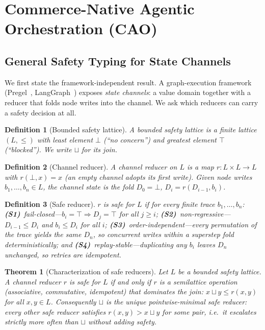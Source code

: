 \documentclass{article}
\newtheorem{definition}{Definition}
\newtheorem{theorem}{Theorem}
\begin{document}
\section{Commerce-Native Agentic Orchestration (CAO)}
\label{sec:cao}

\subsection{General Safety Typing for State Channels}
\label{sec:general_typing}

We first state the framework-independent result. A graph-execution framework
(Pregel~\cite{pregel}, LangGraph~\cite{langgraph}) exposes \emph{state channels}:
a value domain together with a reducer that folds node writes into the channel.
We ask which reducers can carry a safety decision at all.

\begin{definition}[Bounded safety lattice]
A \emph{bounded safety lattice} is a finite lattice $(L,\leq)$ with least element
$\bot$ (``no concern'') and greatest element $\top$ (``blocked''). We write
$\sqcup$ for its join.
\end{definition}

\begin{definition}[Channel reducer]
A \emph{channel reducer} on $L$ is a map $r: L\times L\to L$ with $r(\bot,x)=x$
(an empty channel adopts its first write). Given node writes $b_1,\dots,b_n\in L$,
the channel state is the fold $D_0=\bot$, $D_i=r(D_{i-1},b_i)$.
\end{definition}

\begin{definition}[Safe reducer]
\label{def:safe}
$r$ is \emph{safe} for $L$ if for every finite trace $b_1,\dots,b_n$:
\textbf{(S1)}~\emph{fail-closed}---$b_i=\top\Rightarrow D_j=\top$ for all $j\ge i$;
\textbf{(S2)}~\emph{non-regressive}---$D_{i-1}\le D_i$ and $b_i\le D_i$ for all $i$;
\textbf{(S3)}~\emph{order-independent}---every permutation of the trace yields the same $D_n$,
so concurrent writes within a superstep fold deterministically; and
\textbf{(S4)}~\emph{replay-stable}---duplicating any $b_i$ leaves $D_n$ unchanged, so retries
are idempotent.
\end{definition}

\begin{theorem}[Characterization of safe reducers]
\label{thm:general_char}
Let $L$ be a bounded safety lattice. A channel reducer $r$ is safe for $L$ if and
only if $r$ is a semilattice operation (associative, commutative, idempotent)
that dominates the join: $x\sqcup y\le r(x,y)$ for all $x,y\in L$.
Consequently $\sqcup$ is the unique \emph{pointwise-minimal} safe reducer:
every other safe reducer satisfies $r(x,y)>x\sqcup y$ for some pair, i.e.\ it
escalates strictly more often than $\sqcup$ without adding safety.
\end{theorem}
\end{document}
